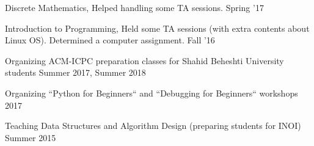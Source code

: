 \begin{cvtas}
  \cvta
    {Discrete Mathematics, } %
    {Helped handling some TA sessions.} %
    {Spring '17} %
    {} %

  \cvta
    {Introduction to Programming, } %
    {Held some TA sessions (with extra contents about Linux OS). Determined a computer assignment.} %
    {Fall '16} %
    {} %


\end{cvtas}




\begin{cvtas}

  \cvta
    {} %
    {Organizing ACM-ICPC preparation classes for Shahid Beheshti University students}
    {Summer 2017, Summer 2018} %
    {} %



  \cvta
    {} %
    {Organizing ``Python for Beginners`` and ``Debugging for Beginners`` workshops} %
    {2017} %
    {} %

  \cvta
    {} %
    {Teaching Data Structures and Algorithm Design (preparing students for INOI)} %
    {Summer 2015} %
    {} %

\end{cvtas}